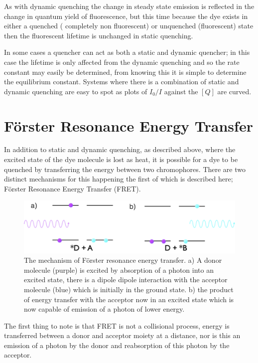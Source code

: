 \documentclass[
]{book}
\begin{document}
As with dynamic quenching the change in steady state emission is reflected in the change in quantum yield of fluorescence, but this time because the dye exists in either a quenched ( completely non fluorescent) or unquenched (fluorescent) state then the fluorescent lifetime is unchanged in static quenching.

In some cases a quencher can act as both a static and dynamic quencher; in this case the lifetime is only affected from the dynamic quenching and so the rate constant may easily be determined, from knowing this it is simple to determine the equilibrium constant. Systems where there is a combination of static and dynamic quenching are easy to spot as plots of \(I_0 / I\) against the \([Q]\) are curved.

\hypertarget{sec:forster}{%
\section{Förster Resonance Energy Transfer}\label{sec:forster}}

In addition to static and dynamic quenching, as described above, where the excited state of the dye molecule is lost as heat, it is possible for a dye to be quenched by transferring the energy between two chromophores. There are two distinct mechanisms for this happening the first of which is described here; Förster Resonance Energy Transfer (FRET).

\begin{figure}

{\centering \includegraphics[width=0.7\linewidth]{images/forster} 

}

\caption{The mechanism of Förster resonance energy transfer. a) A donor molecule (purple) is excited by absorption of a photon into an excited state, there is a dipole dipole interaction with the acceptor molecule (blue) which is initially in the ground state. b) the product of energy transfer with the acceptor now in an excited state which is now capable of emission of a photon of lower energy.}\label{fig:forster}
\end{figure}

The first thing to note is that FRET is not a collisional process, energy is transferred between a donor and acceptor moiety at a distance, nor is this an emission of a photon by the donor and reabsorption of this photon by the acceptor.
\end{document}
